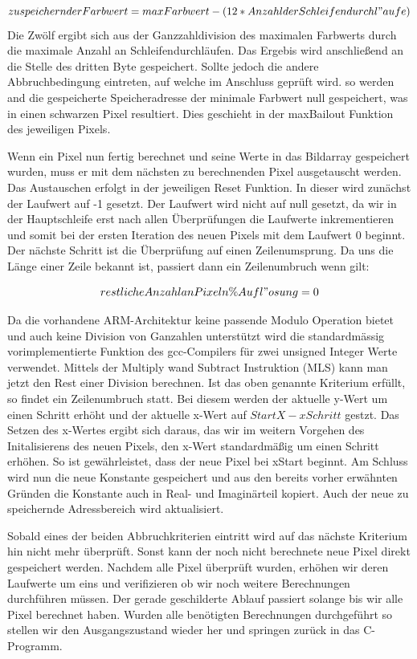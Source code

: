 \documentclass[11pt]{scrartcl}
\begin{document}
\begin{equation*}
    zu speichernder Farbwert = maxFarbwert -( 12*Anzahl der Schleifendurchl"aufe )
\end{equation*}
Die Zwölf ergibt sich aus der Ganzzahldivision des maximalen Farbwerts durch die maximale Anzahl an Schleifendurchläufen.
Das Ergebis wird anschließend an die Stelle des dritten Byte gespeichert.
Sollte jedoch die andere Abbruchbedingung eintreten, auf welche im Anschluss geprüft wird. so werden and die gespeicherte Speicheradresse der minimale Farbwert null gespeichert, was in einen schwarzen Pixel resultiert.
Dies geschieht in der maxBailout Funktion des jeweiligen Pixels.

Wenn ein Pixel nun fertig berechnet und seine Werte in das Bildarray gespeichert wurden, muss er mit dem nächsten zu berechnenden Pixel ausgetauscht werden.
Das Austauschen erfolgt in der jeweiligen Reset Funktion.
In dieser wird zunächst der Laufwert auf -1 gesetzt.
Der Laufwert wird nicht auf null gesetzt, da wir in der Hauptschleife erst nach allen Überprüfungen die Laufwerte inkrementieren und somit bei der ersten Iteration des neuen Pixels mit dem Laufwert 0 beginnt.
Der nächste Schritt ist die Überprüfung auf einen Zeilenumsprung.
Da uns die Länge einer Zeile bekannt ist, passiert dann ein Zeilenumbruch wenn gilt:

\begin{equation*}
  restlicheAnzahl an Pixeln \% Aufl"osung = 0
\end{equation*}

Da die vorhandene ARM-Architektur keine passende Modulo Operation bietet und auch keine Division von Ganzahlen unterstützt wird die standardmässig vorimplementierte Funktion des gcc-Compilers für zwei unsigned Integer Werte verwendet.
Mittels der Multiply wand Subtract Instruktion (MLS) kann man jetzt den Rest einer Division berechnen.
Ist das oben genannte Kriterium erfüllt, so findet ein Zeilenumbruch statt.
Bei diesem werden der aktuelle y-Wert um einen Schritt erhöht und der aktuelle x-Wert auf $StartX - xSchritt$ gestzt.
Das Setzen des x-Wertes ergibt sich daraus, das wir im weitern Vorgehen des Initalisierens des neuen Pixels, den x-Wert standardmäßig um einen Schritt erhöhen.
So ist gewährleistet, dass der neue Pixel bei xStart beginnt.
Am Schluss wird nun die neue Konstante gespeichert und aus den bereits vorher erwähnten Gründen die Konstante auch in Real- und Imaginärteil kopiert.
Auch der neue zu speichernde Adressbereich wird aktualisiert.

Sobald eines der beiden Abbruchkriterien eintritt wird auf das nächste Kriterium hin nicht mehr überprüft.
Sonst kann der noch nicht berechnete neue Pixel direkt gespeichert werden.
Nachdem alle Pixel überprüft wurden, erhöhen wir deren Laufwerte um eins und verifizieren ob wir noch weitere Berechnungen durchführen müssen.
Der gerade geschilderte Ablauf passiert solange bis wir alle Pixel berechnet haben.
Wurden alle benötigten Berechnungen durchgeführt so stellen wir den Ausgangszustand wieder her und springen zurück in das C-Programm.
\end{document}
